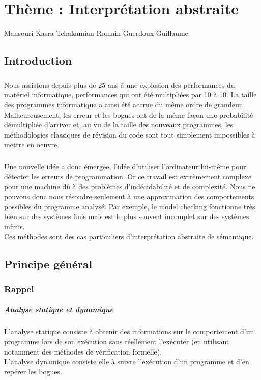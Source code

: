 \documentclass[french]{report}
\begin{document}
\chapter{Thème : Interprétation abstraite}

Mansouri Kasra
Tchakamian Romain
Guerdoux Guillaume


\section{Introduction}

\paragraph{}
Nous assistons depuis plus de 25 ans à une explosion des performances du matériel
informatique, performances qui ont été multipliées par 10 à 10. La taille des
programmes informatique a ainsi été accrue du même ordre de grandeur.
Malheureusement, les erreur et les bogues ont de la même façon une probabilité démultipliée
d'arriver et, au vu de la taille des nouveaux programmes, les méthodologies classiques de
révision du code sont tout simplement impossibles à mettre en oeuvre. \\

\paragraph{}
Une nouvelle idée a donc émergée, l'idée d'utiliser l'ordinateur lui-même pour détecter
les erreurs de programmation. Or ce travail est extrèmement complexe pour une machine dû à des
problèmes d'indécidabilité et de complexité. Nous ne pouvons donc nous résoudre seulement à une approximation
des comportements possibles du programme analysé.
Par exemple, le model checking fonctionne très bien sur des systèmes finis mais est
le plus souvent incomplet sur des systèmes infinis.  \\

Ces méthodes sont des cas particuliers d'interprétation abstraite de sémantique.

\section{Principe général}

\subsection{Rappel}
\paragraph{Analyse statique et dynamique}
L'analyse statique consiste à obtenir des informations sur le comportement d'un programme
lors de son exécution sans réellement l'exécuter (en utilisant notamment des méthodes de
vérification formelle). \\
L'analyse dynamique consiste elle à suivre l’exécution d'un programme et d'en repérer les bogues.
\end{document}
